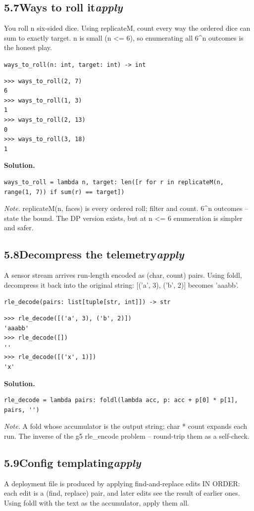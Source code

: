 \documentclass[10pt,letterpaper]{book}
\begin{document}
\subsection*{5.7\quad Ways to roll it\hfill\textnormal{\textit{apply}}}
You roll n six-sided dice. Using replicateM, count every way the ordered dice can sum to exactly target. n is small (n <= 6), so enumerating all 6\^{}n outcomes is the honest play.

\noindent\texttt{ways\_to\_roll(n: int, target: int) -> int}
\begin{lstlisting}[style=ex]
>>> ways_to_roll(2, 7)
6
>>> ways_to_roll(1, 3)
1
>>> ways_to_roll(2, 13)
0
>>> ways_to_roll(3, 18)
1
\end{lstlisting}
\noindent\textbf{Solution.}
\begin{lstlisting}[style=code]
ways_to_roll = lambda n, target: len([r for r in replicateM(n, range(1, 7)) if sum(r) == target])
\end{lstlisting}
\noindent\textit{Note.} replicateM(n, faces) is every ordered roll; filter and count. 6\^{}n outcomes -- state the bound. The DP version exists, but at n <= 6 enumeration is simpler and safer.

\subsection*{5.8\quad Decompress the telemetry\hfill\textnormal{\textit{apply}}}
A sensor stream arrives run-length encoded as (char, count) pairs. Using foldl, decompress it back into the original string: [('a', 3), ('b', 2)] becomes 'aaabb'.

\noindent\texttt{rle\_decode(pairs: list[tuple[str, int]]) -> str}
\begin{lstlisting}[style=ex]
>>> rle_decode([('a', 3), ('b', 2)])
'aaabb'
>>> rle_decode([])
''
>>> rle_decode([('x', 1)])
'x'
\end{lstlisting}
\noindent\textbf{Solution.}
\begin{lstlisting}[style=code]
rle_decode = lambda pairs: foldl(lambda acc, p: acc + p[0] * p[1], pairs, '')
\end{lstlisting}
\noindent\textit{Note.} A fold whose accumulator is the output string; char * count expands each run. The inverse of the g5 rle\_encode problem -- round-trip them as a self-check.

\subsection*{5.9\quad Config templating\hfill\textnormal{\textit{apply}}}
A deployment file is produced by applying find-and-replace edits IN ORDER: each edit is a (find, replace) pair, and later edits see the result of earlier ones. Using foldl with the text as the accumulator, apply them all.
\end{document}
